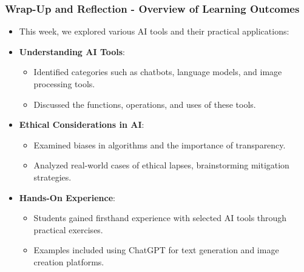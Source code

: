 \documentclass[aspectratio=169]{beamer}
\begin{document}
\begin{frame}[fragile]
    \frametitle{Wrap-Up and Reflection - Overview of Learning Outcomes}
    \begin{itemize}
        \item This week, we explored various AI tools and their practical applications:
        \item \textbf{Understanding AI Tools}:
        \begin{itemize}
            \item Identified categories such as chatbots, language models, and image processing tools.
            \item Discussed the functions, operations, and uses of these tools.
        \end{itemize}
        \item \textbf{Ethical Considerations in AI}:
        \begin{itemize}
            \item Examined biases in algorithms and the importance of transparency.
            \item Analyzed real-world cases of ethical lapses, brainstorming mitigation strategies.
        \end{itemize}
        \item \textbf{Hands-On Experience}:
        \begin{itemize}
            \item Students gained firsthand experience with selected AI tools through practical exercises.
            \item Examples included using ChatGPT for text generation and image creation platforms.
        \end{itemize}
    \end{itemize}
\end{frame}
\end{document}
